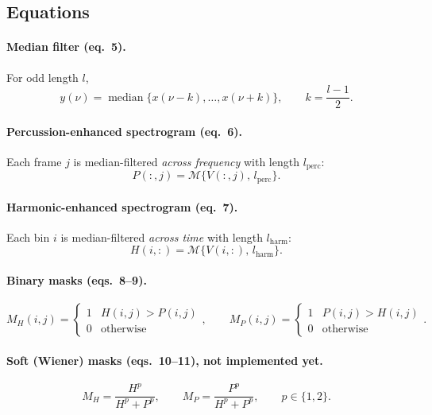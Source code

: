 \documentclass[11pt,a4paper]{article}
\DeclareMathOperator*{\median}{median}
\begin{document}
\subsection{Equations}
\paragraph{Median filter (eq.~5).} For odd length $l$,
\begin{equation}
  y(\nu) = \median\{x(\nu-k), \dots, x(\nu+k)\}, \qquad k=\frac{l-1}{2}.
\end{equation}

\paragraph{Percussion-enhanced spectrogram (eq.~6).} Each frame $j$ is
median-filtered \emph{across frequency} with length $l_{\text{perc}}$:
\begin{equation}
  P(:,j) = \mathcal{M}\{V(:,j),\, l_{\text{perc}}\}.
\end{equation}

\paragraph{Harmonic-enhanced spectrogram (eq.~7).} Each bin $i$ is
median-filtered \emph{across time} with length $l_{\text{harm}}$:
\begin{equation}
  H(i,:) = \mathcal{M}\{V(i,:),\, l_{\text{harm}}\}.
\end{equation}

\paragraph{Binary masks (eqs.~8--9).}
\begin{equation}
  M_H(i,j)=\begin{cases}1 & H(i,j)>P(i,j)\\ 0&\text{otherwise}\end{cases},
  \qquad
  M_P(i,j)=\begin{cases}1 & P(i,j)>H(i,j)\\ 0&\text{otherwise}\end{cases}.
\end{equation}

\paragraph{Soft (Wiener) masks (eqs.~10--11), not implemented yet.}
\begin{equation}
  M_H = \frac{H^p}{H^p+P^p}, \qquad M_P=\frac{P^p}{H^p+P^p},\qquad p\in\{1,2\}.
\end{equation}
\end{document}

